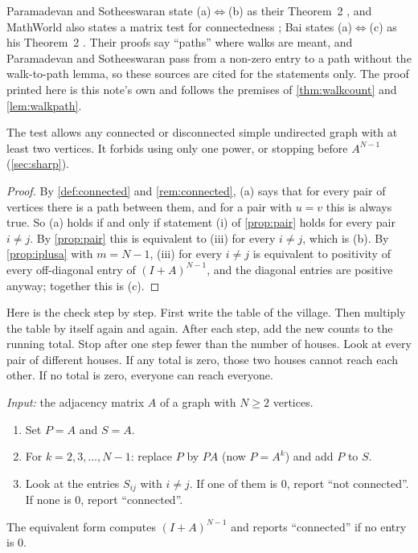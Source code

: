 Paramadevan and Sotheeswaran state (a)$\Leftrightarrow$(b) as their Theorem~2 \cite{paramadevan2021adjacency}, and MathWorld also states a matrix test for connectedness \cite{weisstein_connectedgraph}; Bai states (a)$\Leftrightarrow$(c) as his Theorem~2 \cite{bai2025adjacency}.
Their proofs say ``paths'' where walks are meant, and Paramadevan and Sotheeswaran pass from a non-zero entry to a path without the walk-to-path lemma, so these sources are cited for the statements only.
The proof printed here is this note's own and follows the premises of \cref{thm:walkcount} and \cref{lem:walkpath}.

\begin{remark}
The test allows any connected or disconnected simple undirected graph with at least two vertices.
It forbids using only one power, or stopping before $A^{N-1}$ (\cref{sec:sharp}).
\end{remark}

\begin{proof}
By \cref{def:connected} and \cref{rem:connected}, (a) says that for every pair of vertices there is a path between them, and for a pair with $u=v$ this is always true.
So (a) holds if and only if statement (i) of \cref{prop:pair} holds for every pair $i\ne j$.
By \cref{prop:pair} this is equivalent to (iii) for every $i\ne j$, which is (b).
By \cref{prop:iplusa} with $m=N-1$, (iii) for every $i\ne j$ is equivalent to positivity of every off-diagonal entry of $(I+A)^{N-1}$, and the diagonal entries are positive anyway; together this is (c).
\end{proof}

\plainwords Here is the check step by step.
First write the table of the village.
Then multiply the table by itself again and again.
After each step, add the new counts to the running total.
Stop after one step fewer than the number of houses.
Look at every pair of different houses.
If any total is zero, those two houses cannot reach each other.
If no total is zero, everyone can reach everyone.

\begin{definition}\label{def:testprocedure}
\emph{Input:} the adjacency matrix $A$ of a graph with $N\ge 2$ vertices.
\begin{enumerate}
\item Set $P=A$ and $S=A$.
\item For $k=2,3,\dots,N-1$: replace $P$ by $PA$ (now $P=A^k$) and add $P$ to $S$.
\item Look at the entries $S_{ij}$ with $i\ne j$. If one of them is $0$, report ``not connected''. If none is $0$, report ``connected''.
\end{enumerate}
The equivalent form computes $(I+A)^{N-1}$ and reports ``connected'' if no entry is $0$.
\end{definition}

